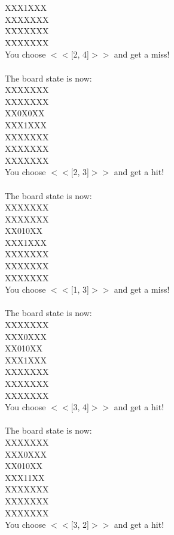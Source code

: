 \documentclass[pdflatex,sn-nature]{sn-jnl}%
\theoremstyle{thmstyleone}%
\theoremstyle{thmstyletwo}%
\theoremstyle{thmstylethree}%
\begin{document}
XXX1XXX $~$\\ 
XXXXXXX $~$\\ 
XXXXXXX $~$\\ 
XXXXXXX $~$\\ 
You choose $<<$[2, 4]$>>$ and get a miss! $~$\\ 
 $~$\\ 
The board state is now: $~$\\ 
XXXXXXX $~$\\ 
XXXXXXX $~$\\ 
XX0X0XX $~$\\ 
XXX1XXX $~$\\ 
XXXXXXX $~$\\ 
XXXXXXX $~$\\ 
XXXXXXX $~$\\ 
You choose $<<$[2, 3]$>>$ and get a hit! $~$\\ 
 $~$\\ 
The board state is now: $~$\\ 
XXXXXXX $~$\\ 
XXXXXXX $~$\\ 
XX010XX $~$\\ 
XXX1XXX $~$\\ 
XXXXXXX $~$\\ 
XXXXXXX $~$\\ 
XXXXXXX $~$\\ 
You choose $<<$[1, 3]$>>$ and get a miss! $~$\\ 
 $~$\\ 
The board state is now: $~$\\ 
XXXXXXX $~$\\ 
XXX0XXX $~$\\ 
XX010XX $~$\\ 
XXX1XXX $~$\\ 
XXXXXXX $~$\\ 
XXXXXXX $~$\\ 
XXXXXXX $~$\\ 
You choose $<<$[3, 4]$>>$ and get a hit! $~$\\ 
 $~$\\ 
The board state is now: $~$\\ 
XXXXXXX $~$\\ 
XXX0XXX $~$\\ 
XX010XX $~$\\ 
XXX11XX $~$\\ 
XXXXXXX $~$\\ 
XXXXXXX $~$\\ 
XXXXXXX $~$\\ 
You choose $<<$[3, 2]$>>$ and get a hit! $~$\\ 
\end{document}
